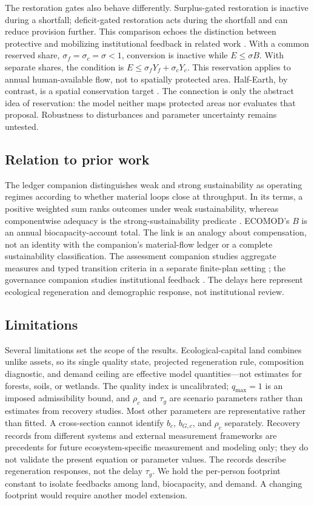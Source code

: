 \documentclass[preprint,12pt,authoryear]{elsarticle}
\begin{document}
The restoration gates also behave differently. Surplus-gated restoration is inactive during a shortfall; deficit-gated restoration acts during the shortfall and can reduce provision further. This comparison echoes the distinction between protective and mobilizing institutional feedback in related work \citep{Abaee2026a}. With a common reserved share, $\sigma_f=\sigma_c=\sigma<1$, conversion is inactive while $E\le\sigma B$. With separate shares, the condition is $E\le\sigma_fY_f+\sigma_cY_c$. This reservation applies to annual human-available flow, not to spatially protected area. Half-Earth, by contrast, is a spatial conservation target \citep{Wilson2016}. The connection is only the abstract idea of reservation: the model neither maps protected areas nor evaluates that proposal. Robustness to disturbances and parameter uncertainty remains untested.

\subsection{Relation to prior work}

The ledger companion distinguishes weak and strong sustainability as operating regimes according to whether material loops close at throughput. In its terms, a positive weighted sum ranks outcomes under weak sustainability, whereas componentwise adequacy is the strong-sustainability predicate \citep[Sections~1.1 and 10.1]{Abaee2026c}. ECOMOD's $B$ is an annual biocapacity-account total. The link is an analogy about compensation, not an identity with the companion's material-flow ledger or a complete sustainability classification. The assessment companion studies aggregate measures and typed transition criteria in a separate finite-plan setting \citep{Abaee2026b}; the governance companion studies institutional feedback \citep{Abaee2026a}. The delays here represent ecological regeneration and demographic response, not institutional review.

\subsection{Limitations}

Several limitations set the scope of the results. Ecological-capital land combines unlike assets, so its single quality state, projected regeneration rule, composition diagnostic, and demand ceiling are effective model quantities—not estimates for forests, soils, or wetlands. The quality index is uncalibrated; $q_{\max}=1$ is an imposed admissibility bound, and $\rho_c$ and $\tau_g$ are scenario parameters rather than estimates from recovery studies. Most other parameters are representative rather than fitted. A cross-section cannot identify $b_c$, $b_{G,c}$, and $\rho_c$ separately. Recovery records from different systems and external measurement frameworks are precedents for future ecosystem-specific measurement and modeling only; they do not validate the present equation or parameter values. The records describe regeneration responses, not the delay $\tau_g$. We hold the per-person footprint constant to isolate feedbacks among land, biocapacity, and demand. A changing footprint would require another model extension.
\end{document}
